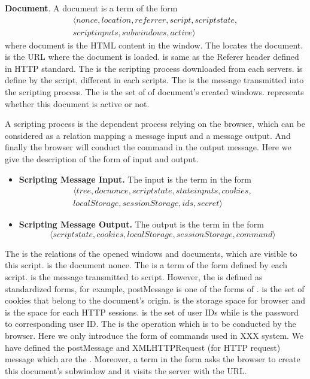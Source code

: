 \vspace{1mm}
\noindent\textbf{Document}. A document  is a term of the form
\begin{multline*}
\langle nonce, location, referrer, script, scriptstate, \\
 scriptinputs, subwindows, active \rangle 
\end{multline*}
where document is the HTML content in the window.  The  locates the document.  is the URL where the document is loaded.  is same as the Referer header defined in HTTP standard. The  is the scripting process downloaded from each servers.  is define by the script, different in each scripts. The  is the message transmitted into the scripting process. The  is the set of  of document's created windows.  represents whether this document is active or not.

A scripting process is the dependent process relying on the browser, which can be considered as a relation  mapping a message input and a message output. And finally the browser will conduct the command in the output message. Here we give the description of the form of input and output.
\begin{itemize}
\setlength\itemsep{-2pt}
\item \textbf{Scripting Message Input. } The input is the term in the form
\begin{multline*}
\langle tree, docnonce, scriptstate, stateinputs,cookies,\\
localStorage, sessionStorage, ids, secret \rangle
\end{multline*}
\item \textbf{Scripting Message Output. }The output is the term in the form
\begin{equation*}
\langle scriptstate, cookies, localStorage,sessionStorage, command \rangle
\end{equation*}
\end{itemize}
The  is the relations of the opened windows and documents, which are visible to this script.  is the document nonce. The   is a term of the form defined by each script.  is the message transmitted to script. However, the  is defined as standardized forms, for example, postMessage is one of the forms of .  is the set of cookies that belong to the document's origin.  is the storage space for browser and  is the space for each HTTP sessions.   is the set of user IDs while  is the password to corresponding user ID. The  is the operation which is to be conducted by the browser. Here we only introduce the form of commands used in XXX system. We have defined the postMessage and XMLHTTPRequest (for HTTP request) message which are the . Moreover, a term in the form  asks the browser to create this document's subwindow and it visits the server with the URL.

